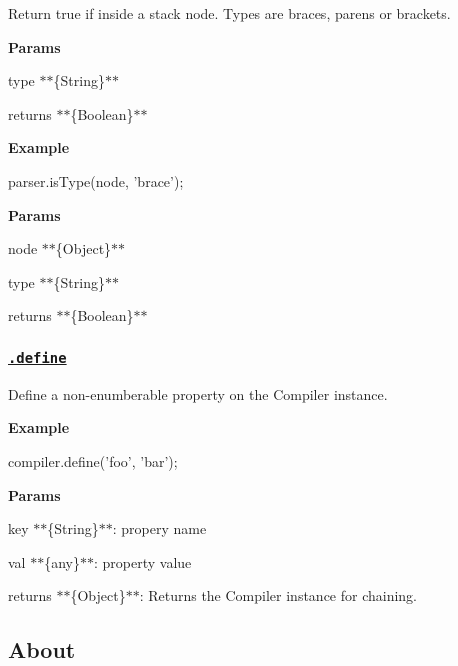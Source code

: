Return true if inside a {\ttfamily stack} node. Types are {\ttfamily braces}, {\ttfamily parens} or {\ttfamily brackets}.

{\bfseries Params}


\begin{DoxyItemize}
\item {\ttfamily type} $\ast$$\ast$\{String\}$\ast$$\ast$
\item {\ttfamily returns} $\ast$$\ast$\{Boolean\}$\ast$$\ast$
\end{DoxyItemize}

{\bfseries Example}


\begin{DoxyCode}
parser.isType(node, 'brace');
\end{DoxyCode}


{\bfseries Params}


\begin{DoxyItemize}
\item {\ttfamily node} $\ast$$\ast$\{Object\}$\ast$$\ast$
\item {\ttfamily type} $\ast$$\ast$\{String\}$\ast$$\ast$
\item {\ttfamily returns} $\ast$$\ast$\{Boolean\}$\ast$$\ast$
\end{DoxyItemize}

\subsubsection*{\href{lib/compiler.js#L71}{\tt .define}}

Define a non-\/enumberable property on the {\ttfamily Compiler} instance.

{\bfseries Example}


\begin{DoxyCode}
compiler.define('foo', 'bar');
\end{DoxyCode}


{\bfseries Params}


\begin{DoxyItemize}
\item {\ttfamily key} $\ast$$\ast$\{String\}$\ast$$\ast$\+: propery name
\item {\ttfamily val} $\ast$$\ast$\{any\}$\ast$$\ast$\+: property value
\item {\ttfamily returns} $\ast$$\ast$\{Object\}$\ast$$\ast$\+: Returns the Compiler instance for chaining.
\end{DoxyItemize}

\subsection*{About}

